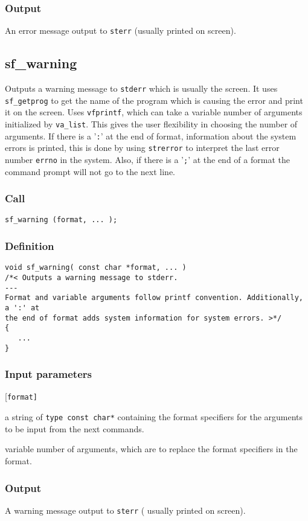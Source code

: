 \subsubsection*{Output}
An error message output to \texttt{sterr} (usually printed on screen).




\subsection{{sf\_warning}}\label{sec:sf_warning}
Outputs a warning message to \texttt{stderr} which is usually the screen. It uses \texttt{sf\_getprog} to get the name of the program which is causing the error and print it on the screen.  Uses \texttt{vfprintf}, which can take a variable number of arguments initialized by \texttt{va\_list}. This gives the user flexibility in choosing the number of arguments.
If there is a '\texttt{:}' at the end of format, information about the system errors is printed, this is done by using \texttt{strerror} to interpret the last error number \texttt{errno} in the system. Also, if there is a '\texttt{;}' at the end of a format the command prompt will not go to the next line.

\subsubsection*{Call}
\begin{verbatim}sf_warning (format, ... );\end{verbatim}

\subsubsection*{Definition}
\begin{verbatim}
void sf_warning( const char *format, ... )
/*< Outputs a warning message to stderr. 
---
Format and variable arguments follow printf convention. Additionally, a ':' at
the end of format adds system information for system errors. >*/
{
   ...
}
\end{verbatim}

\subsubsection*{Input parameters}
\begin{desclist}{\tt }{\quad}[\tt format]
   \setlength\itemsep{0pt}
   \item[format] a string of \texttt{type \texttt{const char*}} containing the format specifiers for the arguments to be input from the next commands. 
   \item[...]    variable number of arguments, which are to replace the format specifiers in the format.     
\end{desclist}

\subsubsection*{Output}
A warning message output to \texttt{sterr} ( usually printed on screen).



